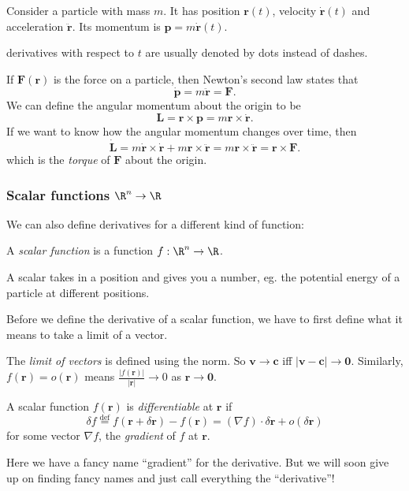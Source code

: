 \documentclass[a4paper]{article}
\begin{document}
\begin{eg}
  Consider a particle with mass $m$. It has position $\mathbf{r}(t)$, velocity $\dot{\mathbf{r}}(t)$ and acceleration $\ddot{\mathbf{r}}$. Its momentum is $\mathbf{p} = m\dot{\mathbf{r}}(t)$.

  \note derivatives with respect to $t$ are usually denoted by dots instead of dashes.

  If $\mathbf{F}(\mathbf{r})$ is the force on a particle, then Newton's second law states that
  \[
    \dot{\mathbf{p}} = m\ddot{\mathbf{r}} = \mathbf{F}.
  \]
  We can define the angular momentum about the origin to be
  \[
    \mathbf{L} = \mathbf{r}\times \mathbf{p} = m\mathbf{r} \times \dot{\mathbf{r}}.
  \]
  If we want to know how the angular momentum changes over time, then
  \[
    \dot{\mathbf{L}} = m\dot{\mathbf{r}}\times \dot{\mathbf{r}} + m\mathbf{r}\times \ddot{\mathbf{r}} = m\mathbf{r}\times \ddot{\mathbf{r}} = \mathbf{r}\times \mathbf{F}.
  \]
  which is the \emph{torque} of $\mathbf{F}$ about the origin.
\end{eg}

\subsubsection*{Scalar functions \texorpdfstring{$\R^n \to \R$}{Rn to R}}
We can also define derivatives for a different kind of function:
\begin{defi}
  A \emph{scalar function} is a function $f: \R^n \to \R$.
\end{defi}
A scalar takes in a position and gives you a number, eg. the potential energy of a particle at different positions.

Before we define the derivative of a scalar function, we have to first define what it means to take a limit of a vector.
\begin{defi}
  The \emph{limit of vectors} is defined using the norm. So $\mathbf{v}\to \mathbf{c}$ iff $|\mathbf{v} - \mathbf{c}| \to \mathbf{0}$. Similarly, $f(\mathbf{r}) = o(\mathbf{r})$ means $\frac{|f(\mathbf{r})|}{|\mathbf{r}|} \to 0$ as $\mathbf{r}\to \mathbf{0}$.
\end{defi}

\begin{defi}
  A scalar function $f(\mathbf{r})$ is \emph{differentiable} at $\mathbf{r}$ if
  \[
    \delta f \stackrel{\text{def}}{=} f(\mathbf{r} + \delta \mathbf{r}) - f(\mathbf{r}) = (\nabla f)\cdot \delta \mathbf{r} + o(\delta \mathbf{r})
  \]
  for some vector $\nabla f$, the \emph{gradient} of $f$ at $\mathbf{r}$.
\end{defi}
Here we have a fancy name ``gradient'' for the derivative. But we will soon give up on finding fancy names and just call everything the ``derivative''!
\end{document}
